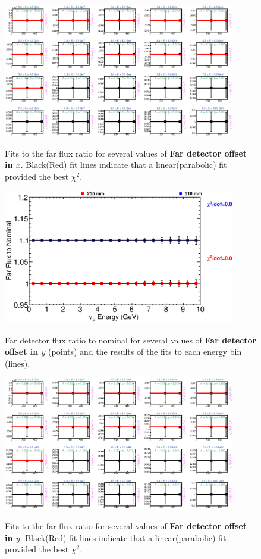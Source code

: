 \begin{figure}[hb]
  \begin{center}
    {\includegraphics[width=4.0in]{figures/LBNENDX_far_fits.eps}}
  \end{center}
\caption{ Fits to the far flux ratio for several values of {\bf Far detector offset in $x$}. Black(Red) fit lines indicate that a linear(parabolic) fit provided the best $\chi^2$. }
\end{figure}

\begin{figure}[ht]
  \begin{center}
    {\includegraphics[width=4.0in]{figures/LBNENDY_far_summary.eps}}
  \end{center}
\caption{ Far detector flux ratio to nominal for several values of {\bf Far detector offset in $y$} (points) and the results of the fits to each energy bin (lines).}
\end{figure}

\begin{figure}[hb]
  \begin{center}
    {\includegraphics[width=4.0in]{figures/LBNENDY_far_fits.eps}}
  \end{center}
\caption{ Fits to the far flux ratio for several values of {\bf Far detector offset in $y$}. Black(Red) fit lines indicate that a linear(parabolic) fit provided the best $\chi^2$. }
\end{figure}


